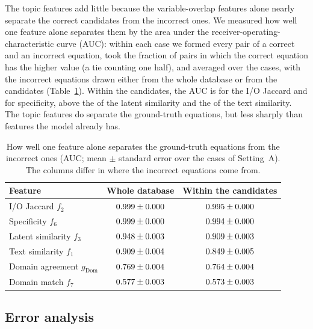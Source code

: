 The topic features add little because the variable-overlap features alone nearly separate the
correct candidates from the incorrect ones. We measured how well one feature alone separates them
by the area under the receiver-operating-characteristic curve (AUC): within each case we formed
every pair of a correct and an incorrect equation, took the fraction of pairs in which the correct
equation has the higher value (a tie counting one half), and averaged over the cases, with the
incorrect equations drawn either from the whole database or from the candidates
(Table~\ref{tab:auc}). Within the candidates, the AUC is \AucCandIoJac{} for the I/O Jaccard and
\AucCandSpec{} for specificity, above the \AucCandLatent{} of the latent similarity and the
\AucCandText{} of the text similarity. The topic features do separate the ground-truth equations,
but less sharply than features the model already has.

\begin{table}[tbp]\centering
\caption{How well one feature alone separates the ground-truth equations from the incorrect ones
(AUC; mean $\pm$ standard error over the cases of Setting~A). The columns differ in where the
incorrect equations come from.}
\label{tab:auc}
\small
\begin{tabular}{lcc}
\toprule
Feature & Whole database & Within the candidates \\
\midrule
I/O Jaccard $f_2$ & $0.999 \pm 0.000$ & $0.995 \pm 0.000$ \\
Specificity $f_6$ & $0.999 \pm 0.000$ & $0.994 \pm 0.000$ \\
Latent similarity $f_3$ & $0.948 \pm 0.003$ & $0.909 \pm 0.003$ \\
Text similarity $f_1$ & $0.909 \pm 0.004$ & $0.849 \pm 0.005$ \\
Domain agreement $g_{\mathrm{Dom}}$ & $0.769 \pm 0.004$ & $0.764 \pm 0.004$ \\
Domain match $f_7$ & $0.577 \pm 0.003$ & $0.573 \pm 0.003$ \\
\bottomrule
\end{tabular}
\end{table}

\subsection{Error analysis}\label{sec:erroranalysis}

